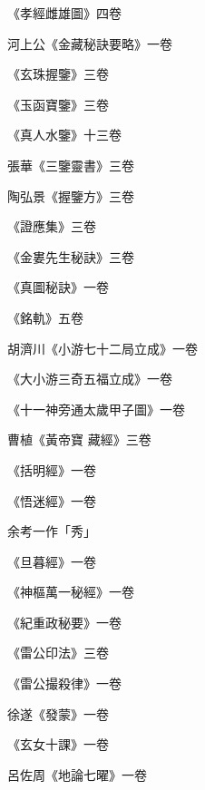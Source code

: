 \begin{pinyinscope}
 《孝經雌雄圖》四卷



 河上公《金藏秘訣要略》一卷



 《玄珠握鑒》三卷



 《玉函寶鑒》三卷



 《真人水鑒》十三卷



 張華《三鑒靈書》三卷



 陶弘景《握鑒方》三卷



 《證應集》三卷



 《金婁先生秘訣》三卷



 《真圖秘訣》一卷



 《銘軌》五卷



 胡濟川《小游七十二局立成》一卷



 《大小游三奇五福立成》一卷



 《十一神旁通太歲甲子圖》一卷



 曹植《黃帝寶
 藏經》三卷



 《括明經》一卷



 《悟迷經》一卷



 余考一作「秀」



 《旦暮經》一卷



 《神樞萬一秘經》一卷



 《紀重政秘要》一卷



 《雷公印法》三卷



 《雷公撮殺律》一卷



 徐遂《發蒙》一卷



 《玄女十課》一卷



 呂佐周《地論七曜》一卷




\end{pinyinscope}

